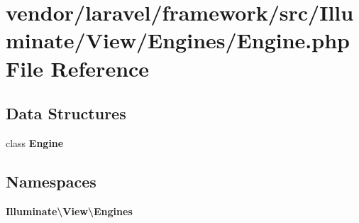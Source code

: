 \section{vendor/laravel/framework/src/\+Illuminate/\+View/\+Engines/\+Engine.php File Reference}
\label{_engine_8php}
\subsection*{Data Structures}
\begin{DoxyCompactItemize}
\item 
class {\bf Engine}
\end{DoxyCompactItemize}
\subsection*{Namespaces}
\begin{DoxyCompactItemize}
\item 
 {\bf Illuminate\textbackslash{}\+View\textbackslash{}\+Engines}
\end{DoxyCompactItemize}
